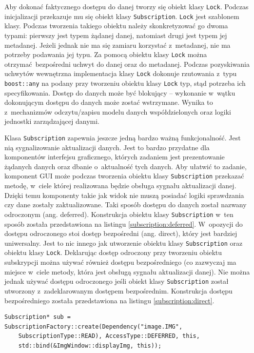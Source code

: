 Aby dokonać faktycznego dostępu do danej tworzy się obiekt klasy \lstinline$Lock$. Podczas inicjalizacji przekazuje mu się obiekt klasy \lstinline$Subscription$. \lstinline$Lock$ jest szablonem klasy. Podczas tworzenia takiego obiektu należy skonkretyzować go dwoma typami: pierwszy jest typem żądanej danej, natomiast drugi jest typem jej metadanej. Jeżeli jednak nie ma się zamiaru korzystać z~metadanej, nie ma potrzeby podawania jej typu. Za pomocą obiektu klasy \lstinline$Lock$ można otrzymać bezpośredni uchwyt do danej oraz do metadanej. Podczas pozyskiwania uchwytów wewnętrzna implementacja klasy \lstinline$Lock$ dokonuje rzutowania z~typu \lstinline$boost::any$ na podany przy tworzeniu obiektu klasy \lstinline$Lock$ typ, stąd potrzeba ich specyfikowania. Dostęp do danych może być blokujący -- wykonanie w~wątku dokonującym dostępu do danych może zostać wstrzymane. Wynika to z~mechanizmów odczytu/zapisu modelu danych współdzielonych oraz logiki jednostki zarządzającej danymi.

Klasa \lstinline$Subscription$ zapewnia jeszcze jedną bardzo ważną funkcjonalność. Jest nią sygnalizowanie aktualizacji danych. Jest to bardzo przydatne dla komponentów interfejsu graficznego, których zadaniem jest prezentowanie żądanych danych oraz dbanie o~aktualność tych danych. Aby ułatwić to zadanie, komponent GUI może podczas tworzenia obiektu klasy \lstinline$Subscription$ przekazać metodę, w~ciele której realizowana będzie obsługa sygnału aktualizacji danej. Dzięki temu komponenty takie jak widok nie muszą posiadać logiki sprawdzania czy dane zostały zaktualizowane. Taki sposób dostępu do danych został nazwany odroczonym (ang. deferred). Konstrukcja obiektu klasy \lstinline$Subscription$ w~ten sposób została przedstawiona na listingu \ref{subscription:deferred}. W~opozycji do dostępu odroczonego stoi dostęp bezpośredni (ang. direct), który jest bardziej uniwersalny. Jest to nic innego jak utworzenie obiektu klasy \lstinline$Subscription$ oraz obiektu klasy \lstinline$Lock$. Deklarując dostęp odroczony przy tworzeniu obiektu subskrypcji można używać również dostępu bezpośredniego (co zazwyczaj ma miejsce w~ciele metody, która jest obsługą sygnału aktualizacji danej). Nie można jednak używać dostępu odroczonego jeśli obiekt klasy \lstinline$Subscription$ został utworzony z~zadeklarowanym dostępem bezpośrednim. Konstrukcja dostępu bezpośredniego została przedstawiona na listingu \ref{subscription:direct}.

\begin{minipage}{\textwidth}
	\begin{lstlisting}[label=subscription:deferred, caption={Przykład tworzenia obiektu klasy \lstinline$Subscription$ z~odroczonym dostępem do danych },alsoletter={()[].=}]	
Subscription* sub = SubscriptionFactory::create(Dependency("image.IMG",
	SubscriptionType::READ), AccessType::DEFERRED, this,
	std::bind(&ImgWindow::displayImg, this));
	
	
	\end{lstlisting}
\end{minipage}


